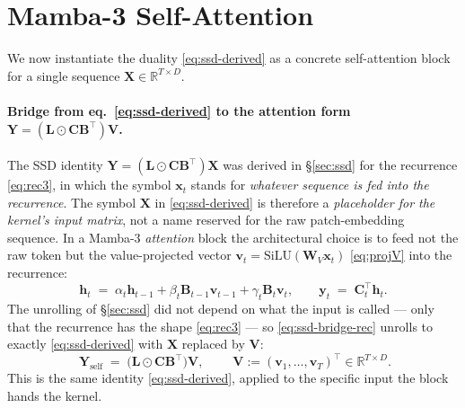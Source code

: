 \documentclass[11pt,a4paper]{article}
\begin{document}
\section{Mamba-3 Self-Attention}
\label{sec:self}

We now instantiate the duality \eqref{eq:ssd-derived} as a concrete
self-attention block for a single sequence
$\bm{X}\in\mathbb{R}^{T\times D}$.

\paragraph{Bridge from eq.~\eqref{eq:ssd-derived} to the attention form $\bm{Y} = (\bm{L}\odot\bm{C}\bm{B}^\top)\bm{V}$.}
The SSD identity $\bm{Y} = (\bm{L}\odot\bm{C}\bm{B}^\top)\bm{X}$ was
derived in \S\ref{sec:ssd} for the recurrence
\eqref{eq:rec3}, in which the symbol $\bm{x}_t$ stands for
\emph{whatever sequence is fed into the recurrence}. The symbol
$\bm{X}$ in \eqref{eq:ssd-derived} is therefore a \emph{placeholder
for the kernel's input matrix}, not a name reserved for the raw
patch-embedding sequence. In a Mamba-3 \emph{attention} block the
architectural choice is to feed not the raw token but the
value-projected vector $\bm{v}_t = \mathrm{SiLU}(\bm{W}_V\bm{x}_t)$
\eqref{eq:projV} into the recurrence:
\begin{equation}\label{eq:ssd-bridge-rec}
  \bm{h}_t \;=\; \alpha_t\bm{h}_{t-1} + \beta_t\bm{B}_{t-1}\bm{v}_{t-1}
                                       + \gamma_t\bm{B}_t\bm{v}_t,
  \qquad
  \bm{y}_t \;=\; \bm{C}_t^\top\bm{h}_t.
\end{equation}
The unrolling of \S\ref{sec:ssd} did not depend on what the input is
called — only that the recurrence has the shape \eqref{eq:rec3} — so
\eqref{eq:ssd-bridge-rec} unrolls to exactly \eqref{eq:ssd-derived}
with $\bm{X}$ replaced by $\bm{V}$:
\begin{equation}\label{eq:self-bridge}
  \boxed{\;\bm{Y}_{\text{self}} \;=\; \bigl(\bm{L}\odot\bm{C}\bm{B}^\top\bigr)\bm{V},\;}
  \qquad
  \bm{V} := (\bm{v}_1,\dots,\bm{v}_T)^\top\in\mathbb{R}^{T\times D}.
\end{equation}
This is the same identity \eqref{eq:ssd-derived}, applied to the
specific input the block hands the kernel.
\end{document}
